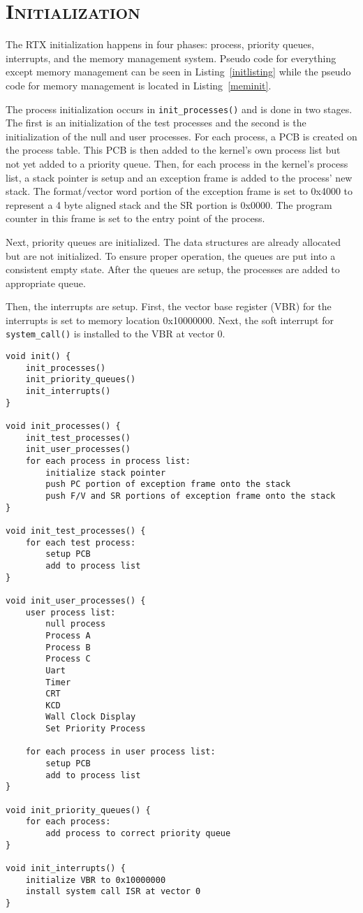 \documentclass[oneside]{report}
\begin{document}
\section{\textsc{Initialization}}
The RTX initialization happens in four phases: process, priority queues, 
interrupts, and the memory management system. Pseudo code for everything except 
memory management can be seen in Listing~\ref{initlisting} while the pseudo code 
for memory management is located in Listing~\ref{meminit}.

The process initialization occurs in \texttt{init\_processes()} and is done in 
two stages. The first is an initialization of the test processes and the second 
is the initialization of the null and user processes. For each process, a PCB is 
created on the process table. This PCB is then added to the kernel's own process 
list but not yet added to a priority queue. Then, for each process in the 
kernel's process list, a stack pointer is setup and an exception frame is added 
to the process' new stack. The format/vector word portion of the exception frame 
is set to 0x4000 to represent a 4 byte aligned stack and the SR portion is 
0x0000. The program counter in this frame is set to the entry point of 
the process.

Next, priority queues are initialized. The data structures are already
allocated but are not initialized. To ensure proper operation, the queues are
put into a consistent empty state. After the queues are setup, the processes
are added to appropriate queue.

Then, the interrupts are setup. First, the vector base register (VBR) for the
interrupts is set to memory location 0x10000000. Next, the soft interrupt for
\texttt{system\_call()} is installed to the VBR at vector 0.

\begin{lstlisting}
void init() {
    init_processes()
    init_priority_queues()
    init_interrupts()
}

void init_processes() {
    init_test_processes()
    init_user_processes()
    for each process in process list:
        initialize stack pointer
        push PC portion of exception frame onto the stack
        push F/V and SR portions of exception frame onto the stack
}

void init_test_processes() {
    for each test process: 
        setup PCB
        add to process list
}

void init_user_processes() {
    user process list:
        null process
        Process A
        Process B
        Process C
        Uart
        Timer
        CRT
        KCD
        Wall Clock Display
        Set Priority Process

    for each process in user process list:
        setup PCB
        add to process list
}

void init_priority_queues() {
    for each process: 
        add process to correct priority queue
}

void init_interrupts() {
    initialize VBR to 0x10000000
    install system call ISR at vector 0
}
\end{lstlisting}
\end{document}
